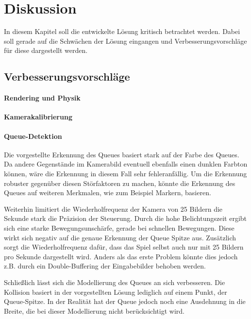 \chapter{Diskussion}
In diesem Kapitel soll die entwickelte Lösung kritisch betrachtet werden. Dabei soll gerade auf die Schwächen der Lösung eingangen und Verbesserungsvorschläge für diese dargestellt werden.



\section{Verbesserungsvorschläge}

\subsubsection{Rendering und Physik}

\subsubsection{Kamerakalibrierung}

\subsubsection{Queue-Detektion}
Die vorgestellte Erkennung des Queues basiert stark auf der Farbe des Queues. 
Da andere Gegenstände im Kamerabild eventuell ebenfalls einen dunklen Farbton können, wäre die Erkennung in diesem Fall sehr fehleranfällig. 
Um die Erkennung robuster gegenüber diesen Störfaktoren zu machen, könnte die Erkennung des Queues auf weiteren Merkmalen, wie zum Beispiel Markern, basieren.

Weiterhin limitiert die Wiederholfrequenz der Kamera von 25 Bildern die Sekunde stark die Präzision der Steuerung. 
Durch die hohe Belichtungszeit ergibt sich eine starke Bewegungsunschärfe, gerade bei schnellen Bewegungen. 
Diese wirkt sich negativ auf die genaue Erkennung der Queue Spitze aus.
Zusätzlich sorgt die Wiederholfrequenz dafür, dass das Spiel selbst auch nur mit 25 Bildern pro Sekunde dargestellt wird. 
Anders als das erste Problem könnte dies jedoch z.B. durch ein Double-Buffering der Eingabebilder behoben werden.

Schließlich lässt sich die Modellierung des Queues an sich verbesseren.
Die Kollision basiert in der vorgestellten Lösung lediglich auf einem Punkt, der Queue-Spitze.
In der Realität hat der Queue jedoch noch eine Ausdehnung in die Breite, die bei dieser Modellierung nicht berücksichtigt wird.